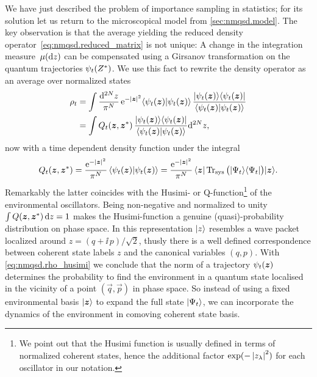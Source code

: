 We have just described the problem of importance sampling in statistics; for its solution let us return to the microscopical model from \autoref{sec:nmqsd.model}.
The key observation is that the average yielding the reduced density operator~\ref{eq:nmqsd.reduced_matrix} is not unique:
A change in the integration measure $\, \mu(\mathrm{d} z)$ can be compensated using a Girsanov transformation on the quantum trajectories $\psi_t({Z}^*)$.
We use this fact to rewrite the density operator as an average over normalized states
\begin{align}
  \label{eq:nmqsd.rho_husimi}
  \rho_t &= \int \frac{\mathrm{d}^{2N} z}{\pi^N} \, \exp[-\abs{\zz}^2] \braket{\psitz}{\psitz} \, \frac{\ket{\psitz}\bra{\psitz}}{\braket{\psitz}{\psitz}} \\
         &= \int Q_t(\zz, \cc\zz) \, \frac{\ket{\psitz}\bra{\psitz}}{\braket{\psitz}{\psitz}} \mathrm{d}^{2N} z, \nonumber
\end{align}
now with a time dependent density function under the integral
\begin{equation}
  Q_t(\zz, \cc\zz) = \frac{\exp[-\abs{\zz}^2]}{\pi^N}\, \braket{\psitz}{\psitz}
                   = \frac{\exp[-\abs{\zz}^2]}{\pi^N}\, \bra{\zz} \Tr{sys} \big( \ket{\Psi_t}\bra{\Psi_t} \big)\ket{\zz}.
    \label{eq:nmqsd.husimi}
\end{equation}
Remarkably the latter coincides with the Husimi- or Q-function\footnote{%
  We point out that the Husimi function is usually defined in terms of normalized coherent states, hence the additional factor $\exp(-\abs{z_\lambda}^2)$ for each oscillator in our notation.
}
of the environmental oscillators\cite{Sc11_quantum_optics}.
Being non-negative and normalized to unity $\int Q(\boldsymbol{z}, {\boldsymbol{z}}^*) \, \mathrm{d} z = 1$ makes the Husimi-function a genuine (quasi)-probability distribution on phase space.
In this representation $| z \rangle$ resembles a wave packet localized around $z = (q + \ii \, p) / \sqrt{2}$, thusly there is a well defined correspondence between coherent state labels $z$ and the canonical variables $(q, p)$.
With \autoref{eq:nmqsd.rho_husimi} we conclude that the norm of a trajectory $\psitz$ determines the probability to find the environment in a quantum state localised in the vicinity of a point $(\vec q, \vec p)$ in phase space.
So instead of using a fixed environmental basis $| \boldsymbol{z} \rangle$ to expand the full state $| \Psi_t \rangle$, we can incorporate the dynamics of the environment in comoving coherent state basis.

